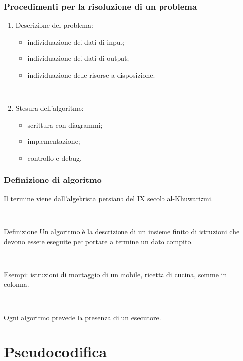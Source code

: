 \documentclass[]{beamer}
\begin{document}
\begin{frame}
\frametitle{Procedimenti per la risoluzione di un problema}
\begin{enumerate}
  \item Descrizione del problema:\pause
  \begin{itemize}
    \item individuazione dei dati di input;\pause
    \item individuazione dei dati di output;\pause
    \item individuazione delle risorse a disposizione.\pause
  \end{itemize}
  
  ~
  
  \item Stesura dell'algoritmo:\pause
  \begin{itemize}
    \item scrittura con diagrammi;\pause
    \item implementazione;\pause
    \item controllo e debug.
  \end{itemize}
\end{enumerate}
\end{frame}


\begin{frame}
\frametitle{Definizione di algoritmo}
Il termine viene dall'algebrista persiano del IX secolo \alert<1>{al-Khuwarizmi}.\pause

~

\begin{block}{Definizione}
Un algoritmo è la descrizione di un insieme finito di istruzioni che devono essere eseguite per portare a termine un dato compito.
\end{block}\pause

~

Esempi: istruzioni di montaggio di un mobile, ricetta di cucina, somme in colonna.\pause

~

Ogni algoritmo prevede la presenza di un \alert{esecutore}.
\end{frame}



\section{Pseudocodifica}
\end{document}
